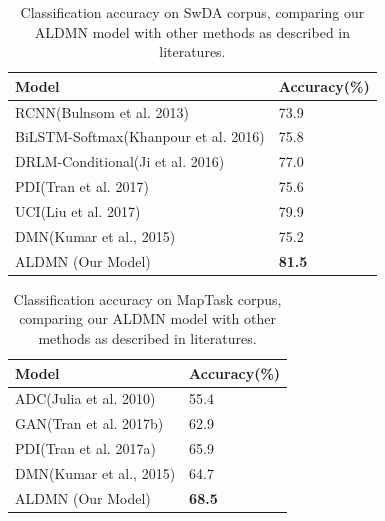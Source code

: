 \documentclass[conference]{IEEEtran}
\begin{document}
	\begin{table}[!t]
		\centering
		\begin{tabular}{p{5.4cm}p{1.2cm}}
			\hline
			Model &Accuracy(\%)\\
			\hline
			RCNN(Bulnsom et al. 2013)&73.9\\
			BiLSTM-Softmax(Khanpour et al. 2016)&75.8\\
			DRLM-Conditional(Ji et al. 2016)&77.0\\
			PDI(Tran et al. 2017)&75.6 \\
			UCI(Liu et al. 2017)&79.9\\
			DMN(Kumar et al., 2015) & 75.2\\
			\hline
			ALDMN (Our Model) & \textbf{81.5} \\
			\hline
		\end{tabular}
		\caption{Classification accuracy on SwDA corpus, comparing our ALDMN model with other methods as described in literatures.}
		\label{table:result_1}
	\end{table}
	
	\begin{table}[!t]
		\centering
		\begin{tabular}{p{5.4cm}p{1.2cm}}%
			\hline
			Model &Accuracy(\%)\\
			\hline
			ADC(Julia et al. 2010)&55.4\\
			GAN(Tran et al. 2017b)&62.9 \\
			PDI(Tran et al. 2017a)&65.9\\
			DMN(Kumar et al., 2015)&64.7\\
			\hline
			ALDMN (Our Model) & \textbf{68.5} \\
			\hline
		\end{tabular}
		\caption{Classification accuracy on MapTask corpus, comparing our ALDMN model with other methods as described in literatures.}	
		\label{table:result_2}
	\end{table}
	
	
\end{document}
